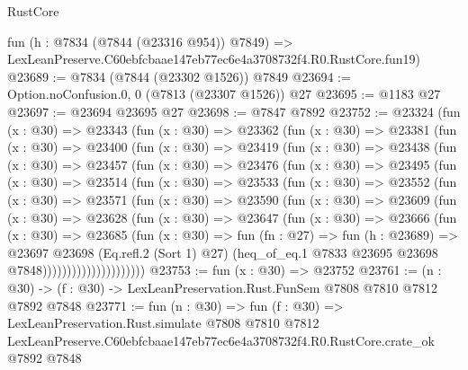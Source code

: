\begin{lexlean}{RustCore}
\begin{coremodule}
    fun (h : @7834 (@7844 (@23316 @954)) @7849) =>
    LexLeanPreserve.C60ebfcbaae147eb77ec6e4a3708732f4.R0.RustCore.fun19)
@23689 := @7834 (@7844 (@23302 @1526)) @7849
@23694 := Option.noConfusion.{0, 0} (@7813 (@23307 @1526)) @27
@23695 := @1183 @27
@23697 := @23694 @23695 @27
@23698 := @7847 @7892
@23752 := @23324
    (fun (x : @30) =>
    @23343
      (fun (x : @30) =>
      @23362
        (fun (x : @30) =>
        @23381
          (fun (x : @30) =>
          @23400
            (fun (x : @30) =>
            @23419
              (fun (x : @30) =>
              @23438
                (fun (x : @30) =>
                @23457
                  (fun (x : @30) =>
                  @23476
                    (fun (x : @30) =>
                    @23495
                      (fun (x : @30) =>
                      @23514
                        (fun (x : @30) =>
                        @23533
                          (fun (x : @30) =>
                          @23552
                            (fun (x : @30) =>
                            @23571
                              (fun (x : @30) =>
                              @23590
                                (fun (x : @30) =>
                                @23609
                                  (fun (x : @30) =>
                                  @23628
                                    (fun (x : @30) =>
                                    @23647
                                      (fun (x : @30) =>
                                      @23666
                                        (fun (x : @30) =>
                                        @23685
                                          (fun (x : @30) =>
                                          fun (fn : @27) =>
                                          fun (h : @23689) =>
                                          @23697
                                            @23698
                                            (Eq.refl.{2} (Sort 1) @27)
                                            (heq_of_eq.{1}
                                              @7833
                                              @23695
                                              @23698
                                              @7848)))))))))))))))))))))
@23753 := fun (x : @30) => @23752
@23761 := (n : @30) -> (f : @30) -> LexLeanPreservation.Rust.FunSem @7808 @7810 @7812 @7892 @7848
@23771 := fun (n : @30) =>
  fun (f : @30) =>
  LexLeanPreservation.Rust.simulate
    @7808
    @7810
    @7812
    LexLeanPreserve.C60ebfcbaae147eb77ec6e4a3708732f4.R0.RustCore.crate_ok
    @7892
    @7848
\end{coremodule}
\end{lexlean}
